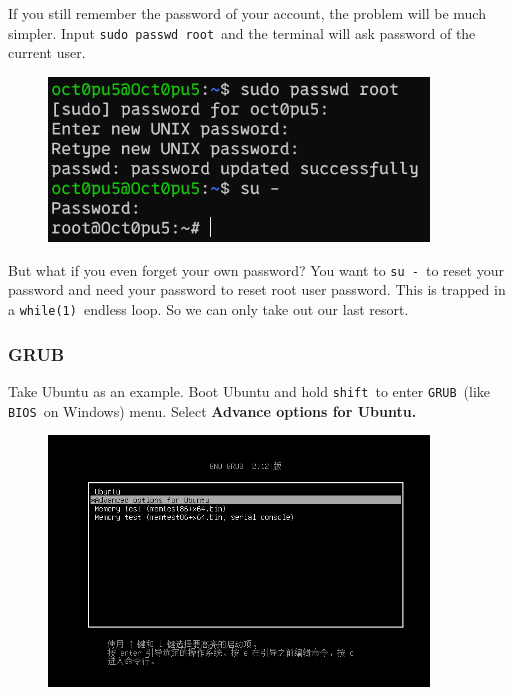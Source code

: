 \documentclass[12pt]{ctexart}
\begin{document}
If you still remember the password of your account, the problem will be
much simpler. Input \texttt{sudo\ passwd\ root}\ and the terminal will
ask password of the current user.

\begin{figure}[H]
    \centering
    \includegraphics[width=0.9\textwidth,keepaspectratio]{assets/Linux/2.1 SHIT, I forgot my password again!/2.png}
\end{figure}

But what if you even forget your own password? You want to
\texttt{su\ -}\ to reset your password and need your password to reset
root user password. This is trapped in a \texttt{while(1)}\ endless loop.
So we can only take out our last resort.

\subsubsection*{\textbf{GRUB}}

Take Ubuntu as an example. Boot Ubuntu and hold \texttt{shift}\ to enter
\texttt{GRUB}\ (like \texttt{BIOS}\ on Windows) menu. Select
\textbf{Advance options for Ubuntu.}

\begin{figure}[H]
    \centering
    \includegraphics[width=0.9\textwidth,keepaspectratio]{assets/Linux/2.1 SHIT, I forgot my password again!/3.png}
\end{figure}
\end{document}
